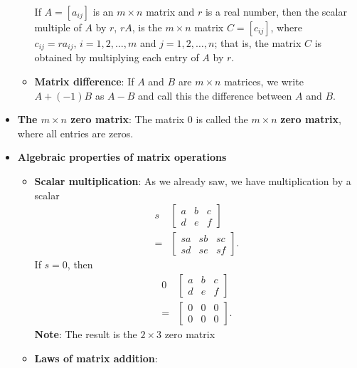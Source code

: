 \documentclass{report}
\begin{document}
\begin{itemize}
\begin{itemize}
                    If \( A = [a_{ij}] \) is an \( m \times n \) matrix and \( r \) is a real number, then the scalar multiple of \( A \) by \( r \), \( rA \), is the \( m \times n \) matrix \( C = [c_{ij}] \), where \( c_{ij} = r a_{ij}, \, i = 1, 2, \ldots, m \) and \( j = 1, 2, \ldots, n \); that is, the matrix \( C \) is obtained by multiplying each entry of \( A \) by \( r \).
                \item \textbf{Matrix difference}:
                    If \( A \) and \( B \) are \( m \times n \) matrices, we write \( A + (-1)B \) as \( A - B \) and call this the difference between \( A \) and \( B \).
            \end{itemize}
        \item \textbf{The $m\times n$ zero matrix}: The matrix 0 is called the $m\times n$ \textbf{zero matrix}, where all entries are zeros.
        \item \textbf{Algebraic properties of matrix operations}
            \begin{itemize}
                \item \textbf{Scalar multiplication}: As we already saw, we have multiplication by a scalar
                    \begin{align*}
                        s &\begin{bmatrix} a & b & c \\d & e & f \end{bmatrix}  \\
                        = &\begin{bmatrix} sa & sb & sc \\ sd & se & sf \end{bmatrix}
                    .\end{align*}
                    If $s=0$, then 
                    \begin{align*}
                        0&\begin{bmatrix} a & b & c \\d & e & f \end{bmatrix}  \\
                        = &\begin{bmatrix} 0 & 0 & 0 \\  0 & 0 & 0 \end{bmatrix}
                    .\end{align*}
                    \bigbreak \noindent 
                    \textbf{Note}: The result is the $2\times 3$ zero matrix
                \item \textbf{Laws of matrix addition}:

\end{itemize}
\end{itemize}
\end{document}
